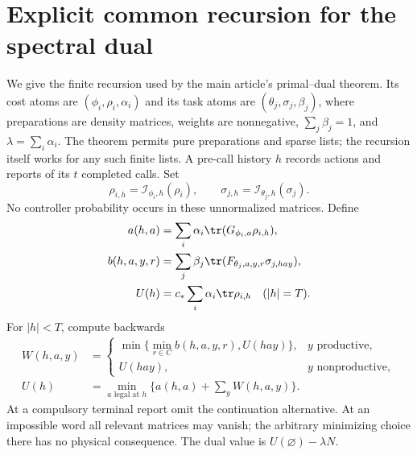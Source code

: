 \section{Explicit common recursion for the spectral dual}
We give the finite recursion used by the main article's primal--dual theorem. Its cost atoms are $(\phi_i,\rho_i,\alpha_i)$ and its task atoms are $(\theta_j,\sigma_j,\beta_j)$, where preparations are density matrices, weights are nonnegative, $\sum_j\beta_j=1$, and $\lambda=\sum_i\alpha_i$. The theorem permits pure preparations and sparse lists; the recursion itself works for any such finite lists. A pre-call history $h$ records actions and reports of its $t$ completed calls. Set
\[
 \rho_{i,h}=\mathcal I_{\phi_i,h}(\rho_i),\qquad
 \sigma_{j,h}=\mathcal I_{\theta_j,h}(\sigma_j).
\]
No controller probability occurs in these unnormalized matrices. Define
\begin{align*}
 a(h,a)&=\sum_i\alpha_i\tr(G_{\phi_i,a}\rho_{i,h}),\\
 b(h,a,y,r)&=\sum_j\beta_j
               \tr(F_{\theta_j,a,y,r}\sigma_{j,hay}),\\
 U(h)&=c_*\sum_i\alpha_i\tr\rho_{i,h}\quad(|h|=T).
\end{align*}
For $|h|<T$, compute backwards
\begin{align*}
 W(h,a,y)&=
 \begin{cases}
 \min\{\min_{r\in C}b(h,a,y,r),U(hay)\},& y\text{ productive},\\
 U(hay),&y\text{ nonproductive},
 \end{cases}\\
 U(h)&=\min_{a\text{ legal at }h}
          \{a(h,a)+\sum_y W(h,a,y)\}.
\end{align*}
At a compulsory terminal report omit the continuation alternative. At an impossible word all relevant matrices may vanish; the arbitrary minimizing choice there has no physical consequence. The dual value is $U(\varnothing)-\lambda N$.

